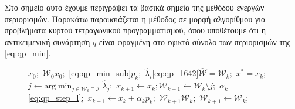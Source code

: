 Στο σημείο αυτό έχουμε περιγράψει τα βασικά σημεία της μεθόδου ενεργών
περιορισμών. Παρακάτω παρουσιάζεται η μέθοδος σε μορφή αλγορίθμου για προβλήματα
κυρτού τετραγωνικού προγραμματισμού, όπου υποθέτουμε ότι η αντικειμενική
συνάρτηση $q$ είναι φραγμένη στο εφικτό σύνολο των περιορισμών της
\eqref{eq:qp_min}.
\begin{figure}[h]
    \begin{otherlanguage}{english}
        \begin{algorithmic}
            \REQUIRE {}$x_0;$
            \REQUIRE {}$\mathcal{W}_0$$x_0;$
            \STATE {}\eqref{eq:qp_min_sub}$p_k;$
            \STATE {}$\hat{\lambda}_i$\eqref{eq:qp_1642}$\mathcal{\hat{W}} =
            \mathcal{W}_k;$
            \RETURN $x^* = x_k;$
            \ELSE
            \STATE $j \leftarrow
            \text{arg}\min_{j\in\mathcal{W}_k\cap\mathcal{I}}\hat{\lambda}_j;$
            \STATE $x_{k+1} \leftarrow x_k; \mathcal{W}_{k+1} \leftarrow
            \mathcal{W}_k\setminus{j};$
            \ENDIF
            \ELSE
            \STATE {}$\alpha_k$\eqref{eq:qp_step_l}$;$
            \STATE $x_{k+1} \leftarrow x_k + \alpha_kp_k;$
            \STATE {}$\mathcal{W}_{k+1}$$\mathcal{W}_k;$
            \ELSE
            \STATE $\mathcal{W}_{k+1} \leftarrow \mathcal{W}_k;$
            \ENDIF
            \ENDIF
            \ENDFOR
        \end{algorithmic}
    \end{otherlanguage}
    \caption{}
\end{figure}

